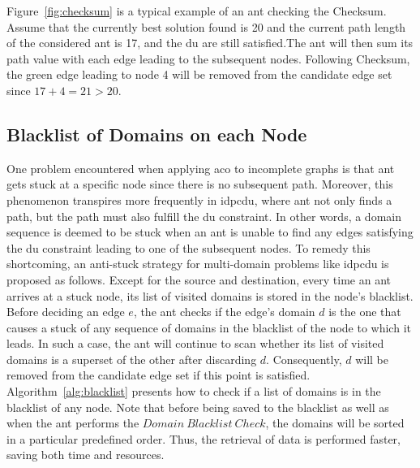 Figure~\ref{fig:checksum} is a typical example of an ant checking the Checksum. Assume that the currently best solution found is 20 and the current path length of the considered ant is 17, and the \gls{du} are still satisfied.The ant will then sum its path value with each edge leading to the subsequent nodes. Following Checksum, the green edge leading to node 4 will be removed from the candidate edge set since $17 + 4 = 21 > 20$.

\subsection{Blacklist of Domains on each Node}
One problem encountered when applying \gls{aco} to incomplete graphs is that ant gets stuck at a specific node since there is no subsequent path. Moreover, this phenomenon transpires more frequently in \gls{idpcdu}, where ant not only finds a path, but the path must also fulfill the \gls{du} constraint. In other words, a domain sequence is deemed to be stuck when an ant is unable to find any edges satisfying the \gls{du} constraint leading to one of the subsequent nodes. To remedy this shortcoming, an anti-stuck strategy for multi-domain problems like \gls{idpcdu} is proposed as follows. Except for the source and destination, every time an ant arrives at a stuck node, its list of visited domains is stored in the node's blacklist. Before deciding an edge $e$, the ant checks if the edge's domain $d$ is the one that causes a stuck of any sequence of domains in the blacklist of the node to which it leads. In such a case, the ant will continue to scan whether its list of visited domains is a superset of the other after discarding $d$. Consequently, $d$ will be removed from the candidate edge set if this point is satisfied. Algorithm~\ref{alg:blacklist} presents how to check if a list of domains is in the blacklist of any node. Note that before being saved to the blacklist as well as when the ant performs the $Domain~Blacklist~Check$, the domains will be sorted in a particular predefined order. Thus, the retrieval of data is performed faster, saving both time and resources.

